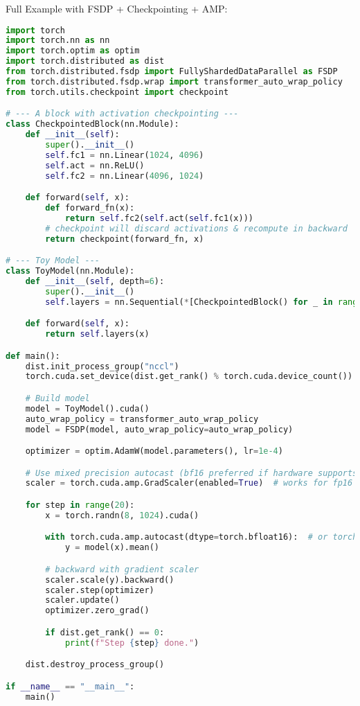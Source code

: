 Full Example with FSDP + Checkpointing + AMP:

\begin{lstlisting}[language=Python]
import torch
import torch.nn as nn
import torch.optim as optim
import torch.distributed as dist
from torch.distributed.fsdp import FullyShardedDataParallel as FSDP
from torch.distributed.fsdp.wrap import transformer_auto_wrap_policy
from torch.utils.checkpoint import checkpoint

# --- A block with activation checkpointing ---
class CheckpointedBlock(nn.Module):
    def __init__(self):
        super().__init__()
        self.fc1 = nn.Linear(1024, 4096)
        self.act = nn.ReLU()
        self.fc2 = nn.Linear(4096, 1024)

    def forward(self, x):
        def forward_fn(x):
            return self.fc2(self.act(self.fc1(x)))
        # checkpoint will discard activations & recompute in backward
        return checkpoint(forward_fn, x)

# --- Toy Model ---
class ToyModel(nn.Module):
    def __init__(self, depth=6):
        super().__init__()
        self.layers = nn.Sequential(*[CheckpointedBlock() for _ in range(depth)])

    def forward(self, x):
        return self.layers(x)

def main():
    dist.init_process_group("nccl")
    torch.cuda.set_device(dist.get_rank() % torch.cuda.device_count())

    # Build model
    model = ToyModel().cuda()
    auto_wrap_policy = transformer_auto_wrap_policy
    model = FSDP(model, auto_wrap_policy=auto_wrap_policy)

    optimizer = optim.AdamW(model.parameters(), lr=1e-4)

    # Use mixed precision autocast (bf16 preferred if hardware supports it)
    scaler = torch.cuda.amp.GradScaler(enabled=True)  # works for fp16

    for step in range(20):
        x = torch.randn(8, 1024).cuda()

        with torch.cuda.amp.autocast(dtype=torch.bfloat16):  # or torch.float16
            y = model(x).mean()

        # backward with gradient scaler
        scaler.scale(y).backward()
        scaler.step(optimizer)
        scaler.update()
        optimizer.zero_grad()

        if dist.get_rank() == 0:
            print(f"Step {step} done.")

    dist.destroy_process_group()

if __name__ == "__main__":
    main()
\end{lstlisting}
